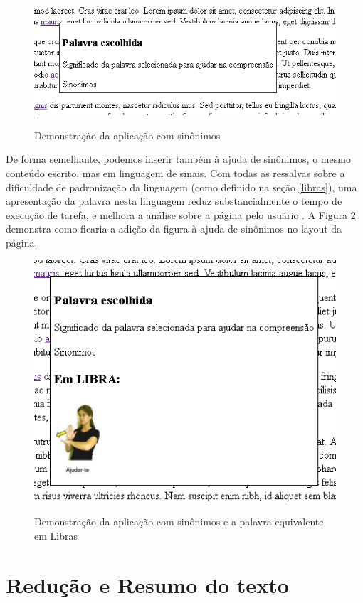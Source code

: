 \documentclass[
	12pt,				%
	oneside,			%
	a4paper,			%
	english,			%
	brazil				%
	]{abntex2ppgsi}
\begin{document}
\begin{figure}[htbp]
	\centering
	\caption{Demonstração da aplicação com sinônimos}
	\includegraphics{prototipoCego.png}
	\label{fig:prototipoSinonimo}

\end{figure}

De forma semelhante, podemos inserir também à ajuda de sinônimos, o mesmo conteúdo escrito, mas em linguagem de sinais. Com todas as ressalvas sobre a dificuldade de padronização da linguagem (como definido na seção \ref{libras}), uma apresentação da palavra nesta linguagem reduz substancialmente o tempo de execução de tarefa, e melhora a análise sobre a página pelo usuário \cite{deafPeople}. A Figura \ref{fig:prototipoLibra} demonstra como ficaria a adição da figura à ajuda de sinônimos no layout da página.

\begin{figure}[htbp]
	\centering
	\caption{Demonstração da aplicação com sinônimos e a palavra equivalente em Libras}
	\includegraphics{prototipoLibra.png}
	\label{fig:prototipoLibra}
\end{figure}

\section{Redução e Resumo do texto}
\end{document}
